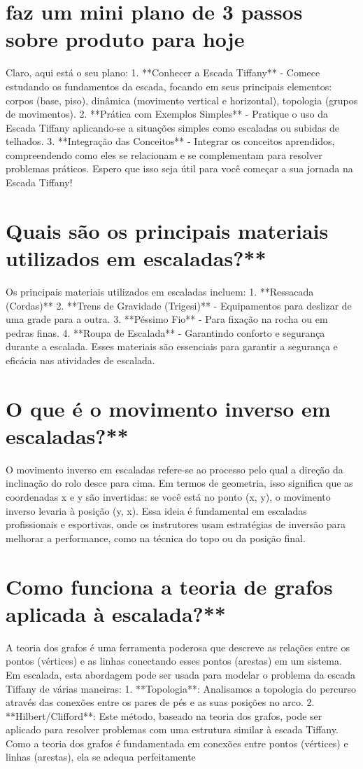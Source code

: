 \documentclass[11pt,a4paper]{article}
\begin{document}
\section{faz um mini plano de 3 passos sobre produto para hoje}
Claro, aqui está o seu plano: 1. **Conhecer a Escada Tiffany** - Comece estudando os fundamentos da escada, focando em seus principais elementos: corpos (base, piso), dinâmica (movimento vertical e horizontal), topologia (grupos de movimentos). 2. **Prática com Exemplos Simples** - Pratique o uso da Escada Tiffany aplicando-se a situações simples como escaladas ou subidas de telhados. 3. **Integração das Conceitos** - Integrar os conceitos aprendidos, compreendendo como eles se relacionam e se complementam para resolver problemas práticos. Espero que isso seja útil para você começar a sua jornada na Escada Tiffany!

\section{Quais são os principais materiais utilizados em escaladas?**}
Os principais materiais utilizados em escaladas incluem: 1. **Ressacada (Cordas)** 2. **Trens de Gravidade (Trigesi)** - Equipamentos para deslizar de uma grade para a outra. 3. **Péssimo Fio** - Para fixação na rocha ou em pedras finas. 4. **Roupa de Escalada** - Garantindo conforto e segurança durante a escalada. Esses materiais são essenciais para garantir a segurança e eficácia nas atividades de escalada.

\section{O que é o movimento inverso em escaladas?**}
O movimento inverso em escaladas refere-se ao processo pelo qual a direção da inclinação do rolo desce para cima. Em termos de geometria, isso significa que as coordenadas x e y são invertidas: se você está no ponto (x, y), o movimento inverso levaria à posição (y, x). Essa ideia é fundamental em escaladas profissionais e esportivas, onde os instrutores usam estratégias de inversão para melhorar a performance, como na técnica do topo ou da posição final.

\section{Como funciona a teoria de grafos aplicada à escalada?**}
A teoria dos grafos é uma ferramenta poderosa que descreve as relações entre os pontos (vértices) e as linhas conectando esses pontos (arestas) em um sistema. Em escalada, esta abordagem pode ser usada para modelar o problema da escada Tiffany de várias maneiras: 1. **Topologia**: Analisamos a topologia do percurso através das conexões entre os pares de pés e as suas posições no arco. 2. **Hilbert/Clifford**: Este método, baseado na teoria dos grafos, pode ser aplicado para resolver problemas com uma estrutura similar à escada Tiffany. Como a teoria dos grafos é fundamentada em conexões entre pontos (vértices) e linhas (arestas), ela se adequa perfeitamente
\end{document}
